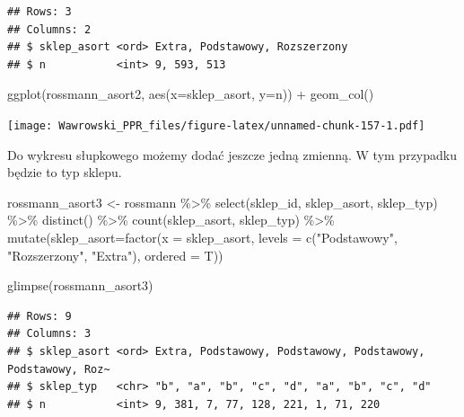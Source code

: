 \documentclass[
]{book}
\newenvironment{Shaded}{\begin{snugshade}}{\end{snugshade}}
\newcommand{\AttributeTok}[1]{\textcolor[rgb]{0.77,0.63,0.00}{#1}}
\newcommand{\FunctionTok}[1]{\textcolor[rgb]{0.00,0.00,0.00}{#1}}
\newcommand{\NormalTok}[1]{#1}
\newcommand{\OtherTok}[1]{\textcolor[rgb]{0.56,0.35,0.01}{#1}}
\newcommand{\SpecialCharTok}[1]{\textcolor[rgb]{0.00,0.00,0.00}{#1}}
\newcommand{\StringTok}[1]{\textcolor[rgb]{0.31,0.60,0.02}{#1}}
\begin{document}
\begin{verbatim}
## Rows: 3
## Columns: 2
## $ sklep_asort <ord> Extra, Podstawowy, Rozszerzony
## $ n           <int> 9, 593, 513
\end{verbatim}

\begin{Shaded}
\begin{Highlighting}[]
\FunctionTok{ggplot}\NormalTok{(rossmann\_asort2, }\FunctionTok{aes}\NormalTok{(}\AttributeTok{x=}\NormalTok{sklep\_asort, }\AttributeTok{y=}\NormalTok{n)) }\SpecialCharTok{+}
  \FunctionTok{geom\_col}\NormalTok{()}
\end{Highlighting}
\end{Shaded}

\texttt{[image: Wawrowski\_PPR\_files/figure-latex/unnamed-chunk-157-1.pdf]}

Do wykresu słupkowego możemy dodać jeszcze jedną zmienną. W tym przypadku będzie to typ sklepu.

\begin{Shaded}
\begin{Highlighting}[]
\NormalTok{rossmann\_asort3 }\OtherTok{\textless{}{-}}\NormalTok{ rossmann }\SpecialCharTok{\%\textgreater{}\%}
  \FunctionTok{select}\NormalTok{(sklep\_id, sklep\_asort, sklep\_typ) }\SpecialCharTok{\%\textgreater{}\%}
  \FunctionTok{distinct}\NormalTok{() }\SpecialCharTok{\%\textgreater{}\%}
  \FunctionTok{count}\NormalTok{(sklep\_asort, sklep\_typ) }\SpecialCharTok{\%\textgreater{}\%}
  \FunctionTok{mutate}\NormalTok{(}\AttributeTok{sklep\_asort=}\FunctionTok{factor}\NormalTok{(}\AttributeTok{x =}\NormalTok{ sklep\_asort,}
                            \AttributeTok{levels =} \FunctionTok{c}\NormalTok{(}\StringTok{"Podstawowy"}\NormalTok{, }
                                       \StringTok{"Rozszerzony"}\NormalTok{, }
                                       \StringTok{"Extra"}\NormalTok{), }
                            \AttributeTok{ordered =}\NormalTok{ T))}

\FunctionTok{glimpse}\NormalTok{(rossmann\_asort3)}
\end{Highlighting}
\end{Shaded}

\begin{verbatim}
## Rows: 9
## Columns: 3
## $ sklep_asort <ord> Extra, Podstawowy, Podstawowy, Podstawowy, Podstawowy, Roz~
## $ sklep_typ   <chr> "b", "a", "b", "c", "d", "a", "b", "c", "d"
## $ n           <int> 9, 381, 7, 77, 128, 221, 1, 71, 220
\end{verbatim}
\end{document}
